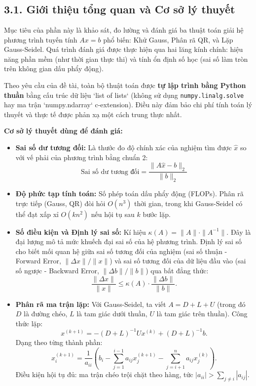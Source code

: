 \newpage
\chapter*{}
{}

\section*{3.1. Giới thiệu tổng quan và Cơ sở lý thuyết}
{}

Mục tiêu của phần này là khảo sát, đo lường và đánh giá ba thuật toán giải hệ phương trình tuyến tính $Ax = b$ phổ biến: Khử Gauss, Phân rã QR, và Lặp Gauss-Seidel. Quá trình đánh giá được thực hiện qua hai lăng kính chính: hiệu năng phần mềm (như thời gian thực thi) và tính ổn định số học (sai số làm tròn trên không gian dấu phẩy động).

Theo yêu cầu của đề tài, toàn bộ thuật toán được \textbf{tự lập trình bằng Python thuần} bằng cấu trúc dữ liệu `list of lists` (không sử dụng \texttt{numpy.linalg.solve} hay ma trận `numpy.ndarray` c-extension). Điều này đảm bảo chi phí tính toán lý thuyết và thực tế được phản xạ một cách trung thực nhất.

\textbf{Cơ sở lý thuyết dùng để đánh giá:}
\begin{itemize}
    \item \textbf{Sai số dư tương đối:} Là thước đo độ chính xác của nghiệm tìm được $\hat{x}$ so với vế phải của phương trình bằng chuẩn 2:
    $$ \text{Sai số dư tương đối} = \frac{\|A\hat{x} - b\|_2}{\|b\|_2} $$
    \item \textbf{Độ phức tạp tính toán:} Số phép toán dấu phẩy động (FLOPs). Phân rã trực tiếp (Gauss, QR) đòi hỏi $O(n^3)$ thời gian, trong khi Gauss-Seidel có thể đạt xấp xỉ $O(k n^2)$ nếu hội tụ sau $k$ bước lặp.
    \item \textbf{Số điều kiện và Định lý sai số:} Kí hiệu $\kappa(A) = \|A\| \cdot \|A^{-1}\|$. Đây là đại lượng mô tả mức khuếch đại sai số của hệ phương trình. Định lý sai số cho biết mối quan hệ giữa sai số tương đối của nghiệm (sai số thuận - Forward Error, $\|\Delta x\|/\|x\|$) và sai số tương đối của dữ liệu đầu vào (sai số ngược - Backward Error, $\|\Delta b\|/\|b\|$) qua bất đẳng thức:
    $$ \frac{\|\Delta x\|}{\|x\|} \leq \kappa(A) \cdot \frac{\|\Delta b\|}{\|b\|}. $$
    \item \textbf{Phân rã ma trận lặp:} Với Gauss-Seidel, ta viết $A = D + L + U$ (trong đó $D$ là đường chéo, $L$ là tam giác dưới thuần, $U$ là tam giác trên thuần). Công thức lặp:
    $$ x^{(k+1)} = -(D+L)^{-1}U x^{(k)} + (D+L)^{-1}b. $$
    Dạng theo từng thành phần:
    $$ x_i^{(k+1)} = \frac{1}{a_{ii}}\left(b_i - \sum_{j=1}^{i-1} a_{ij} x_j^{(k+1)} - \sum_{j=i+1}^{n} a_{ij} x_j^{(k)}\right). $$
    Điều kiện hội tụ đủ: ma trận chéo trội chặt theo hàng, tức $|a_{ii}| > \sum_{j \ne i} |a_{ij}|$.
\end{itemize}


